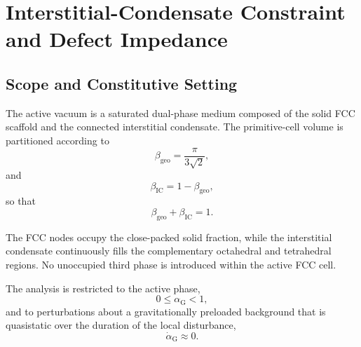 \chapter{Interstitial-Condensate Constraint and Defect Impedance}
\label{app:condensate_impedance}

\begin{abstract}
\noindent This appendix establishes the mechanical response of the interstitial condensate within the active FCC vacuum. It defines the incrementally incompressible coherent branch, separating the singular bulk constraint from the finite gravitational yield pressure. It then formulates the localized relative-flow action for a topological defect, constructing the mode-resolved added-inertia functional and defining the microscopic impedance projection as a boundary-value functional as a mode-weighted inverse penetration length. Canonical defect-flow solutions and the numerical evaluation of the projection remain open boundary-value problems.
\end{abstract}

\section{Scope and Constitutive Setting}

The active vacuum is a saturated dual-phase medium composed of the solid FCC scaffold and the connected interstitial condensate. The primitive-cell volume is partitioned according to
\begin{equation}
    \beta_{\mathrm{geo}} = \frac{\pi}{3\sqrt{2}},
\end{equation}
and
\begin{equation}
    \beta_{\mathrm{IC}} = 1-\beta_{\mathrm{geo}},
\end{equation}
so that
\begin{equation}
    \beta_{\mathrm{geo}}+\beta_{\mathrm{IC}}=1.
\end{equation}

The FCC nodes occupy the close-packed solid fraction, while the interstitial condensate continuously fills the complementary octahedral and tetrahedral regions. No unoccupied third phase is introduced within the active FCC cell.

The analysis is restricted to the active phase,
\begin{equation}
    0 \leq \alpha_{\mathrm{G}} < 1,
\end{equation}
and to perturbations about a gravitationally preloaded background that is quasistatic over the duration of the local disturbance,
\begin{equation}
    \dot{\alpha}_{\mathrm{G}} \approx 0.
\end{equation}

